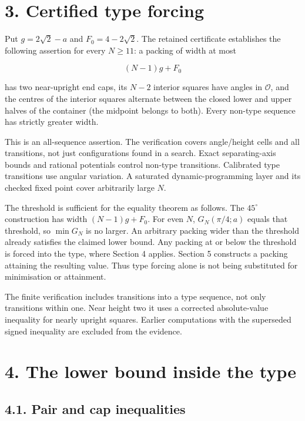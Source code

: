 \documentclass[
  11pt,
  a4paper,
]{article}
\begin{document}
\section{3. Certified type forcing}\label{certified-type-forcing}

Put \(g=2\sqrt2-a\) and \(F_0=4-2\sqrt2\). The retained certificate
establishes the following assertion for every \(N\ge11\): a packing of
width at most

\[
(N-1)g+F_0
\]

has two near-upright end caps, its \(N-2\) interior squares have angles
in \(\mathcal O\), and the centres of the interior squares alternate
between the closed lower and upper halves of the container (the midpoint
belongs to both). Every non-type sequence has strictly greater width.

This is an all-sequence assertion. The verification covers angle/height
cells and all transitions, not just configurations found in a search.
Exact separating-axis bounds and rational potentials control non-type
transitions. Calibrated type transitions use angular variation. A
saturated dynamic-programming layer and its checked fixed point cover
arbitrarily large \(N\).

The threshold is sufficient for the equality theorem as follows. The
\(45^\circ\) construction has width \((N-1)g+F_0\). For even \(N\),
\(G_N(\pi/4;a)\) equals that threshold, so \(\min G_N\) is no larger. An
arbitrary packing wider than the threshold already satisfies the claimed
lower bound. Any packing at or below the threshold is forced into the
type, where Section 4 applies. Section 5 constructs a packing attaining
the resulting value. Thus type forcing alone is not being substituted
for minimisation or attainment.

The finite verification includes transitions into a type sequence, not
only transitions within one. Near height two it uses a corrected
absolute-value inequality for nearly upright squares. Earlier
computations with the superseded signed inequality are excluded from the
evidence.

\section{4. The lower bound inside the
type}\label{the-lower-bound-inside-the-type}

\subsection{4.1. Pair and cap
inequalities}\label{pair-and-cap-inequalities}
\end{document}
